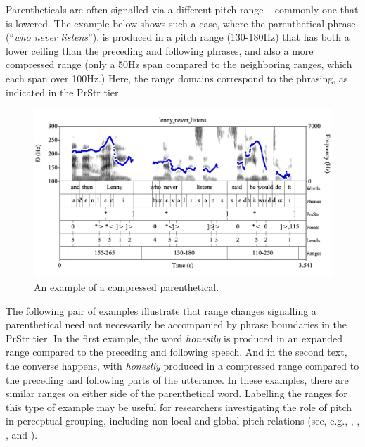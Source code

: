\documentclass[11pt, twoside]{memoir}
\def\langtext#1{\textit{#1}}
\begin{document}
Parentheticals are often signalled via a different pitch range – commonly one that is lowered. The example below shows such a case, where the parenthetical phrase (“\langtext{who never listens}”), is produced in a pitch range (130-180Hz) that has both a lower ceiling than the preceding and following phrases, and also a more compressed range (only a 50Hz span compared to the neighboring ranges, which each span over 100Hz.) Here, the range domains correspond to the phrasing, as indicated in the PrStr tier.

\begin{figure}[H]
\centering
%
\includegraphics[width=.875\linewidth]{Ranges-lenny_never_listens-adv.png}
%
\caption{An example of a compressed parenthetical.%
\label{fig:lenny_never_listens Ranges Adv}%
}
\end{figure}

The following pair of examples illustrate that range changes signalling a parenthetical need not necessarily be accompanied by phrase boundaries in the PrStr tier. In the first example, the word \langtext{honestly} is produced in an expanded range compared to the preceding and following speech. And in the second text, the converse happens, with \langtext{honestly} produced in a compressed range compared to the preceding and following parts of the utterance. In these examples, there are similar ranges on either side of the parenthetical word. Labelling the ranges for this type of example may be useful for researchers investigating the role of pitch in perceptual grouping, including non-local and global pitch relations (see, e.g., \citealt{ladd88}, \citealt{geluykensswerts93, geluykensswerts94}, \citealt{brugos09}, and \citealt{kentnerfery13}).%
\end{document}
